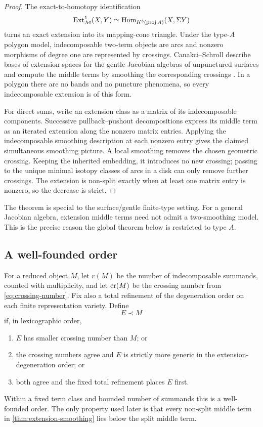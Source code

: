 \begin{proof}
The exact-to-homotopy identification
\[
 \operatorname{Ext}^1_{\mathcal M}(X,Y)
 \simeq\operatorname{Hom}_{K^b(\operatorname{proj} A)}(X,\Sigma Y)
\]
turns an exact extension into its mapping-cone triangle.  Under the type-$A$
polygon model, indecomposable two-term objects are arcs and nonzero morphisms
of degree one are represented by crossings.  Canakci--Schroll describe bases
of extension spaces for the gentle Jacobian algebras of unpunctured surfaces
and compute the middle terms by smoothing the corresponding crossings
\cite{CanakciSchroll}.  In a polygon there are no bands and no puncture
phenomena, so every indecomposable extension is of this form.

For direct sums, write an extension class as a matrix of its indecomposable
components.  Successive pullback--pushout decompositions express its middle
term as an iterated extension along the nonzero matrix entries.  Applying the
indecomposable smoothing description at each nonzero entry gives the claimed
simultaneous smoothing picture.  A local smoothing removes the chosen
geometric crossing.  Keeping the inherited embedding, it introduces no new
crossing; passing to the unique minimal isotopy classes of arcs in a disk can
only remove further crossings.  The extension is non-split exactly when at
least one matrix entry is nonzero, so the decrease is strict.
\end{proof}

\begin{remark}
The theorem is special to the surface/gentle finite-type setting.  For a
general Jacobian algebra, extension middle terms need not admit a two-smoothing
model.  This is the precise reason the global theorem below is restricted to
type $A$.
\end{remark}

\subsection{A well-founded order}

For a reduced object $M$, let $r(M)$ be the number of indecomposable summands,
counted with multiplicity, and let $\operatorname{cr}(M)$ be the crossing number from
\eqref{eq:crossing-number}.  Fix also a total refinement of the degeneration
order on each finite representation variety.  Define
\[
 E\prec M
\]
if, in lexicographic order,
\begin{enumerate}[label=(\alph*),leftmargin=2.2em]
\item $E$ has smaller crossing number than $M$; or
\item the crossing numbers agree and $E$ is strictly more generic in the
      extension-degeneration order; or
\item both agree and the fixed total refinement places $E$ first.
\end{enumerate}
Within a fixed term class and bounded number of summands this is a
well-founded order.  The only property used later is that every non-split
middle term in \cref{thm:extension-smoothing} lies below the split middle term.

